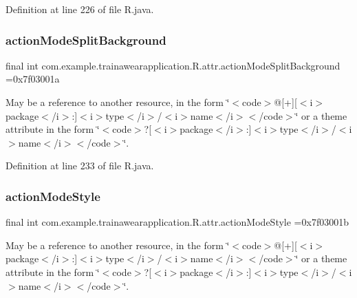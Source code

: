 Definition at line 226 of file R.\+java.

\mbox{\label{classcom_1_1example_1_1trainawearapplication_1_1_r_1_1attr_ab0cd8a67acbcc219fb6e8f64e1bef764}} 
\subsubsection{\texorpdfstring{actionModeSplitBackground}{actionModeSplitBackground}}
{\footnotesize\ttfamily final int com.\+example.\+trainawearapplication.\+R.\+attr.\+action\+Mode\+Split\+Background =0x7f03001a\hspace{0.3cm}{\ttfamily [static]}}

May be a reference to another resource, in the form \char`\"{}$<$code$>$@\mbox{[}+\mbox{]}\mbox{[}$<$i$>$package$<$/i$>$\+:\mbox{]}$<$i$>$type$<$/i$>$/$<$i$>$name$<$/i$>$$<$/code$>$\char`\"{} or a theme attribute in the form \char`\"{}$<$code$>$?\mbox{[}$<$i$>$package$<$/i$>$\+:\mbox{]}$<$i$>$type$<$/i$>$/$<$i$>$name$<$/i$>$$<$/code$>$\char`\"{}. 

Definition at line 233 of file R.\+java.

\mbox{\label{classcom_1_1example_1_1trainawearapplication_1_1_r_1_1attr_ae18c970d339cf6b793b47eddc5ffe7a5}} 
\subsubsection{\texorpdfstring{actionModeStyle}{actionModeStyle}}
{\footnotesize\ttfamily final int com.\+example.\+trainawearapplication.\+R.\+attr.\+action\+Mode\+Style =0x7f03001b\hspace{0.3cm}{\ttfamily [static]}}

May be a reference to another resource, in the form \char`\"{}$<$code$>$@\mbox{[}+\mbox{]}\mbox{[}$<$i$>$package$<$/i$>$\+:\mbox{]}$<$i$>$type$<$/i$>$/$<$i$>$name$<$/i$>$$<$/code$>$\char`\"{} or a theme attribute in the form \char`\"{}$<$code$>$?\mbox{[}$<$i$>$package$<$/i$>$\+:\mbox{]}$<$i$>$type$<$/i$>$/$<$i$>$name$<$/i$>$$<$/code$>$\char`\"{}. 

